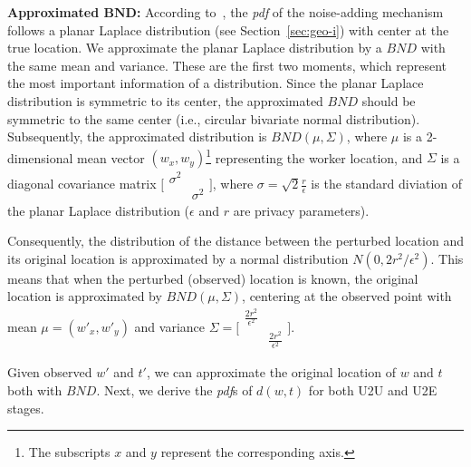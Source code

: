 \documentclass{USC-Thesis}
\numberwithin{equation}{chapter}
\begin{document}
\textbf{Approximated $\mathit{\mathbf{BND}}$:}
According to~\cite{andres2013geo}, the \emph{pdf} of the noise-adding mechanism follows a planar Laplace distribution (see Section~\ref{sec:geo-i}) with center at the true location. We approximate the planar Laplace distribution by a $\mathit{BND}$ with the same mean and variance. These are the first two moments, which represent the most important information of a distribution. Since the planar Laplace distribution is symmetric to its center, the approximated $\mathit{BND}$ should be symmetric to the same center (i.e., circular bivariate normal distribution). Subsequently, the approximated distribution is $\mathit{BND(\mu,\Sigma)}$, where $\mu$ is a 2-dimensional mean vector $(w_x,w_y)$\footnote{The subscripts $x$ and $y$ represent the corresponding axis. } representing the worker location, and $\Sigma$ is a diagonal covariance matrix $\bigl[ \begin{smallmatrix} \sigma^2&\\&\sigma^2\end{smallmatrix}\bigr]$, where $\sigma=\sqrt{2}\frac{r}{\epsilon}$ is the standard diviation of the planar Laplace distribution ($\epsilon$ and $r$ are privacy parameters).

Consequently, the distribution of the distance between the perturbed location and its original location is approximated by a normal distribution $\mathit{N(0,2r^2/\epsilon^2)}$. This means that when the perturbed (observed) location is known, the original location is approximated by $\mathit{BND(\mu,\Sigma)}$, centering at the observed point with mean $\mu=(w'_x,w'_y)$ and variance $\Sigma=\bigl[ \begin{smallmatrix}\frac{2r^2}{\epsilon^2}&\\&\frac{2r^2}{\epsilon^2}\end{smallmatrix}\bigr]$.


Given observed $w'$ and $t'$, we can approximate the original location of $w$ and $t$ both with $\mathit{BND}$. Next, we derive the \emph{pdf}s of $d(w,t)$ for both U2U and U2E stages.

%
\end{document}
